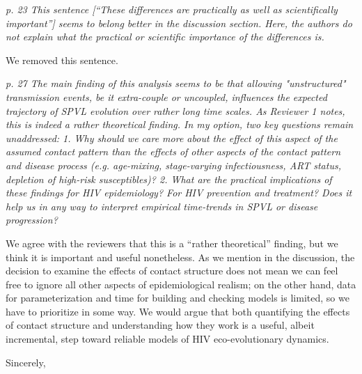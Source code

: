 \documentclass[10pt]{letter}
\newcommand{\revcomment}[1]{\emph{#1}}
\newcommand{\response}[1]{#1}
\begin{document}
\begin{letter}{
}
\revcomment{
p. 23 
This sentence [``These differences are practically as well as
scientifically important''] seems to belong better in the discussion section. Here, the authors do not explain what the practical or scientific importance of the differences is.
}

\response{
We removed this sentence.
}

\revcomment{
p. 27 The main finding of this analysis seems to be that allowing "unstructured" transmission events, be it extra-couple or uncoupled, influences the expected trajectory of SPVL evolution over rather long time scales. As Reviewer 1 notes, this is indeed a rather theoretical finding. In my option, two key questions remain unaddressed: 1. Why should we care more about the effect of this aspect of the assumed contact pattern than the effects of other aspects of the contact pattern and disease process (e.g. age-mixing, stage-varying infectiousness, ART status, depletion of high-risk susceptibles)?
2. What are the practical implications of these findings for HIV
epidemiology? For HIV prevention and treatment? Does it help us in any
way to interpret empirical time-trends in SPVL or disease progression?
}

\response{
We agree with the reviewers that this is a ``rather theoretical'' finding,
but we think it is important and useful nonetheless.  As we mention
in the discussion, the decision to examine the effects of contact
structure does not mean we can feel free to ignore all other aspects
of epidemiological realism; on the other hand, data for
parameterization and time for building and checking models is
limited, so we have to prioritize in some way. We would argue that
both quantifying the effects of contact structure and understanding
how they work is a useful, albeit incremental, step toward reliable
models of HIV eco-evolutionary dynamics.
}

\closing{Sincerely,}



\end{letter}
\end{document}

